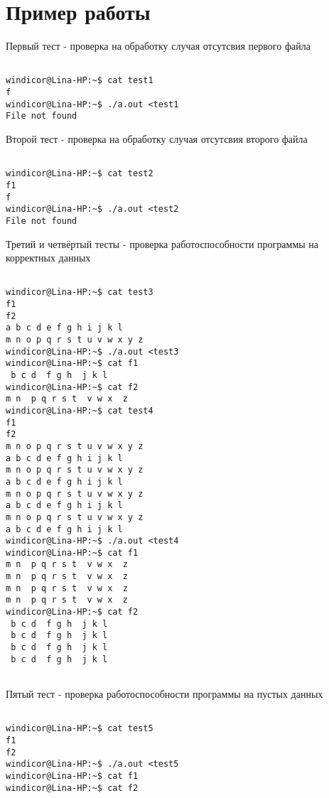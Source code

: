 \section{Пример работы}

Первый тест - проверка на обработку случая отсутсвия первого файла

\begin{verbatim}

windicor@Lina-HP:~$ cat test1
f
windicor@Lina-HP:~$ ./a.out <test1
File not found

\end{verbatim}

Второй тест - проверка на обработку случая отсутсвия второго файла

\begin{verbatim}

windicor@Lina-HP:~$ cat test2
f1
f
windicor@Lina-HP:~$ ./a.out <test2
File not found

\end{verbatim}

Третий и четвёртый тесты - проверка работоспособности программы на корректных данных

\begin{verbatim}

windicor@Lina-HP:~$ cat test3
f1
f2
a b c d e f g h i j k l
m n o p q r s t u v w x y z
windicor@Lina-HP:~$ ./a.out <test3
windicor@Lina-HP:~$ cat f1
 b c d  f g h  j k l 
windicor@Lina-HP:~$ cat f2
m n  p q r s t  v w x  z
windicor@Lina-HP:~$ cat test4
f1
f2
m n o p q r s t u v w x y z
a b c d e f g h i j k l
m n o p q r s t u v w x y z
a b c d e f g h i j k l
m n o p q r s t u v w x y z
a b c d e f g h i j k l
m n o p q r s t u v w x y z
a b c d e f g h i j k l
windicor@Lina-HP:~$ ./a.out <test4
windicor@Lina-HP:~$ cat f1
m n  p q r s t  v w x  z
m n  p q r s t  v w x  z
m n  p q r s t  v w x  z
m n  p q r s t  v w x  z
windicor@Lina-HP:~$ cat f2
 b c d  f g h  j k l 
 b c d  f g h  j k l 
 b c d  f g h  j k l
 b c d  f g h  j k l
 
\end{verbatim}

Пятый тест - проверка работоспособности программы на пустых данных

\begin{verbatim}
 
windicor@Lina-HP:~$ cat test5
f1
f2
windicor@Lina-HP:~$ ./a.out <test5
windicor@Lina-HP:~$ cat f1
windicor@Lina-HP:~$ cat f2

\end{verbatim}

\pagebreak


